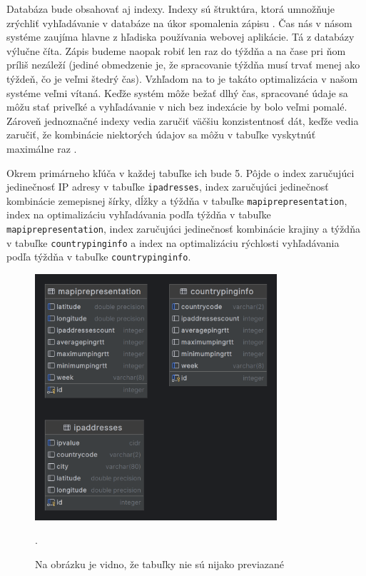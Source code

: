 Databáza bude obsahovať aj indexy. Indexy sú štruktúra, ktorá umnožňuje zrýchliť vyhľadávanie v databáze na úkor spomalenia zápisu \cite{db_index}. 
Čas nás v násom systéme zaujíma hlavne z hľadiska používania webovej aplikácie. Tá z databázy výlučne číta. Zápis budeme naopak robiť len raz do týždňa 
a na čase pri ňom príliš nezáleží (jediné obmedzenie je, že spracovanie týždňa musí trvať menej ako týždeň, čo je veľmi štedrý čas). Vzhľadom na to je 
takáto optimalizácia v našom systéme veľmi vítaná. Keďže systém môže bežať dlhý čas, spracované údaje sa môžu stať priveľké a vyhľadávanie v nich bez 
indexácie by bolo veľmi pomalé. Zároveň jednoznačné indexy vedia zaručiť väčšiu konzistentnosť dát, keďže vedia zaručiť, že kombinácie niektorých údajov 
sa môžu v tabuľke vyskytnúť maximálne raz \cite{index_strategy}.

Okrem primárneho kľúča v každej tabuľke ich bude 5. Pôjde o index zaručujúci jedinečnosť IP adresy v tabuľke 
\lstinline{ipadresses}, index zaručujúci jedinečnosť kombinácie zemepisnej šírky, dĺžky a týždňa v tabuľke \lstinline{mapiprepresentation}, index na 
optimalizáciu vyhľadávania podľa týždňa v tabuľke \lstinline{mapiprepresentation}, index zaručujúci jedinečnosť kombinácie krajiny a týždňa v tabuľke 
\lstinline{countrypinginfo} a index na optimalizáciu rýchlosti vyhľadávania podľa týždňa v tabuľke \lstinline{countrypinginfo}.

\begin{figure}
    \centerline{\includegraphics[width=0.8\textwidth]{images/ipinfoviewerprocesseddb}}
    \caption[Entitno-relačný digram k lokálnej databáze]{Na obrázku je vidno, že tabuľky nie sú nijako previazané}.
    \label{obr:entitn_diagram}
\end{figure}